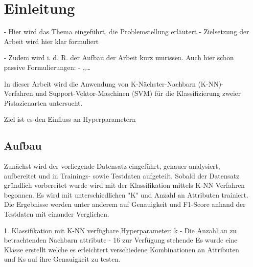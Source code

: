 
\section{Einleitung}

- Hier wird das Thema eingeführt, die Problemstellung erläutert 
- Zielsetzung der Arbeit wird hier klar formuliert

- Zudem wird i. d. R. der Aufbau der Arbeit kurz umrissen.
Auch hier schon passive Formulierungen:
- „…


In dieser Arbeit wird die Anwendung von K-Nächster-Nachbarn (K-NN)-Verfahren und Support-Vektor-Maschinen (SVM) für die Klassifizierung zweier Pistazienarten untersucht. 

Ziel ist es den Einfluss an Hyperparametern 

\subsection{Aufbau}
Zunächst wird der vorliegende Datensatz eingeführt, genauer analysiert, aufbereitet und in Trainings- sowie Testdaten aufgeteilt.
Sobald der Datensatz gründlich vorbereitet wurde wird mit der Klassifikation mittels K-NN Verfahren begonnen. 
Es wird mit unterschiedlichen "K" und Anzahl an Attributen trainiert. 
Die Ergebnisse werden unter anderem auf Genauigkeit und F1-Score anhand der Testdaten mit einander Verglichen.

1. Klassifikation mit K-NN
verfügbare Hyperparameter:
 k - Die Anzahl an zu betrachtenden Nachbarn
 attribute - 16 zur Verfügung stehende
Es wurde eine Klasse erstellt welche es erleichtert verschiedene Kombinationen an Attributen und Ks auf ihre Genauigkeit zu testen. 
